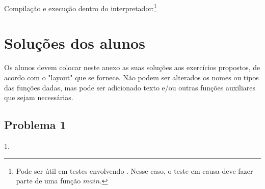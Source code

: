 \documentclass[a4paper]{article}
\newcommand{\Varid}[1]{\mathit{#1}}
\def\resethooks{%
  \global\let\SaveRestoreHook\empty
  \global\let\ColumnHook\empty}
\let\hspre\empty
\let\hspost\empty
\begin{document}
Compilação e execução dentro do interpretador:\footnote{Pode ser útil em testes
envolvendo . Nesse caso, o teste em causa deve fazer parte de uma função
\ensuremath{\Varid{main}}.}
\resethooks


\section{Soluções dos alunos}\label{sec:resolucao}
Os alunos devem colocar neste anexo as suas soluções aos exercícios
propostos, de acordo com o "layout" que se fornece. Não podem ser
alterados os nomes ou tipos das funções dadas, mas pode ser adicionado texto e/ou 
outras funções auxiliares que sejam necessárias.

\subsection*{Problema 1}

1.
\end{document}
